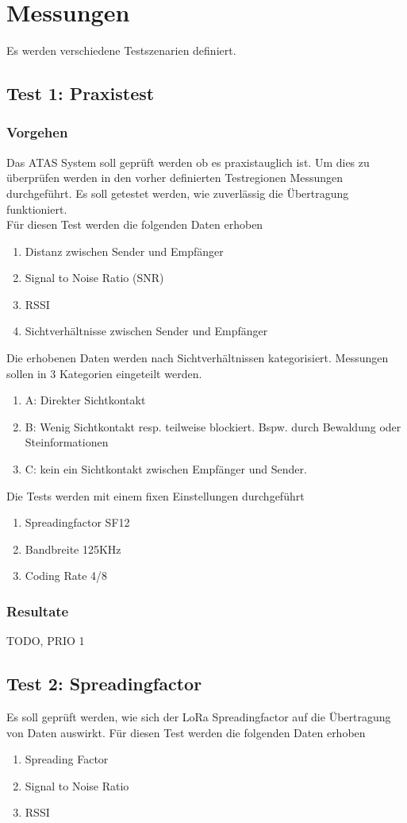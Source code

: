 \documentclass[11pt,english,german]{report}
\theoremstyle{definition}
\begin{document}
\newpage
\section{Messungen}
Es werden verschiedene Testszenarien definiert.

\subsection{Test 1: Praxistest}
\subsubsection{Vorgehen}
Das ATAS System soll geprüft werden ob es praxistauglich ist. Um dies zu überprüfen werden in den vorher definierten Testregionen Messungen durchgeführt. Es soll getestet werden, wie zuverlässig die Übertragung funktioniert.\\[0.3cm]
Für diesen Test werden die folgenden Daten erhoben
\begin{enumerate}
	\item Distanz zwischen Sender und Empfänger
	\item Signal to Noise Ratio (SNR)
	\item RSSI
	\item Sichtverhältnisse zwischen Sender und Empfänger
\end{enumerate}	
Die erhobenen Daten werden nach Sichtverhältnissen kategorisiert. Messungen sollen in 3 Kategorien eingeteilt werden.
\begin{enumerate}
	\item A: Direkter Sichtkontakt
	\item B: Wenig Sichtkontakt resp. teilweise blockiert. Bspw. durch Bewaldung oder Steinformationen
	\item C: kein ein Sichtkontakt zwischen Empfänger und Sender.
\end{enumerate}
Die Tests werden mit einem fixen Einstellungen durchgeführt
\begin{enumerate}
	\item Spreadingfactor SF12
	\item Bandbreite 125KHz
	\item Coding Rate 4/8
\end{enumerate}
\newpage
\subsubsection{Resultate}
TODO, PRIO 1

\newpage
\subsection{Test 2: Spreadingfactor}
Es soll geprüft werden, wie sich der LoRa Spreadingfactor auf die Übertragung von Daten auswirkt.
Für diesen Test werden die folgenden Daten erhoben
\begin{enumerate}
	\item Spreading Factor
	\item Signal to Noise Ratio
	\item RSSI
\end{enumerate}
\end{document}
